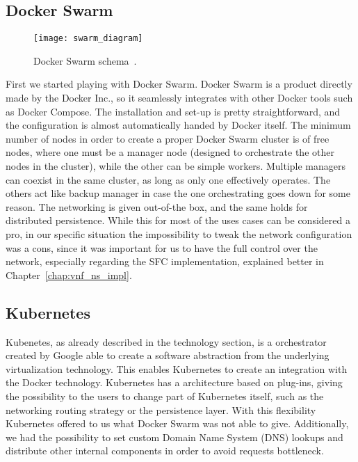 \subsection{Docker Swarm}

\begin{figure}[t]
  \centering
  \texttt{[image: swarm\_diagram]}
  \caption[Docker Swarm schema]{Docker Swarm schema~\cite{dockerSwarmWiki}.}
  \label{chap:archimpl:sec:secondattempt:img:dockerswarm}
\end{figure}

First we started playing with Docker Swarm. Docker Swarm is a product directly
made by the Docker Inc., so it seamlessly integrates with other Docker tools
such as Docker Compose. The installation and set-up is pretty straightforward,
and the configuration is almost automatically handed by Docker itself. The
minimum number of nodes in order to create a proper Docker Swarm cluster is of
free nodes, where one must be a manager node (designed to orchestrate the other
nodes in the cluster), while the other can be simple workers. Multiple managers
can coexist in the same cluster, as long as only one effectively operates. The
others act like backup manager in case the one orchestrating goes down for some
reason. The networking is given out-of-the box, and the same holds for
distributed persistence. While this for most of the uses cases can be considered
a pro, in our specific situation the impossibility to tweak the network
configuration was a cons, since it was important for us to have the full control
over the network, especially regarding the SFC implementation, explained better
in Chapter~\ref{chap:vnf_ns_impl}.

\subsection{Kubernetes}
Kubenetes, as already described in the technology section, is a orchestrator 
created by Google able to create a software abstraction from the underlying 
virtualization technology. This enables Kubernetes to create an integration 
with the Docker technology. Kubernetes has a architecture based on plug-ins, 
giving  the possibility to the users to change part of Kubernetes itself, such 
as the networking routing strategy or the persistence layer. With this 
flexibility Kubernetes offered to us what Docker Swarm was not able to give. 
Additionally, we had the possibility to set custom Domain Name System (DNS) 
lookups and distribute other internal components in order to avoid requests 
bottleneck.

